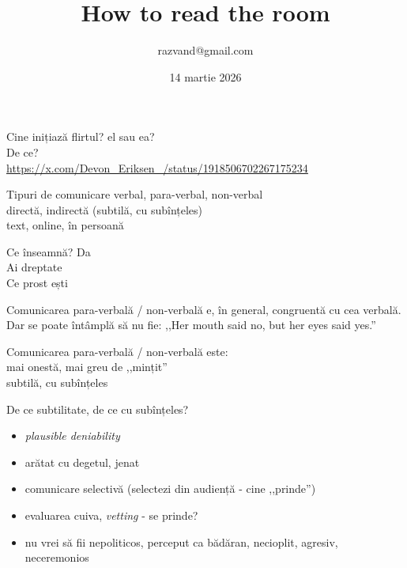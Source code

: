 \documentclass{simple}
\title[How to read the room]{How to read the room}
\institute{Excursie, Bușteni}
\author[Razvan Deaconescu]{razvand@gmail.com}
\date{14 martie 2026}
\begin{document}
\frame{\titlepage}

\begin{frame}{Cine inițiază flirtul?}
  \centering
  \pause
  \Large
  el sau ea? \\
  \pause
  \vspace{1cm}
  De ce? \\
  \pause
  \vspace{1cm}
  \small
  \url{https://x.com/Devon_Eriksen_/status/1918506702267175234}
\end{frame}

\begin{frame}{Tipuri de comunicare}
  \centering
  \pause
  \Large
  verbal, para-verbal, non-verbal \\
  \pause
  \vspace{1cm}
  directă, indirectă (subtilă, cu subînțeles) \\
  \pause
  \vspace{1cm}
  text, online, în persoană
\end{frame}

\begin{frame}{Ce înseamnă?}
  \centering
  \pause
  \Large
  Da \\
  \pause
  \vspace{1cm}
  Ai dreptate \\
  \pause
  \vspace{1cm}
  Ce prost ești
\end{frame}

\begin{frame}{}
  \centering
  \pause
  \Large
  Comunicarea para-verbală / non-verbală e, în general, congruentă cu cea verbală. \\
  \pause
  \vspace{1cm}
  Dar se poate întâmplă să nu fie: ,,Her mouth said no, but her eyes said yes.''
\end{frame}

\begin{frame}{}
  \centering
  \pause
  \Large
  Comunicarea para-verbală / non-verbală este: \\
  \pause
  \vspace{1cm}
  mai onestă, mai greu de ,,mințit'' \\
  \pause
  \vspace{1cm}
  subtilă, cu subînțeles
\end{frame}

\begin{frame}{De ce subtilitate, de ce cu subînțeles?}
  \begin{itemize}
    \pause \item \textit{plausible deniability}
    \pause \item arătat cu degetul, jenat
    \pause \item comunicare selectivă (selectezi din audiență - cine ,,prinde'')
    \pause \item evaluarea cuiva, \textit{vetting} - se prinde?
    \pause \item nu vrei să fii nepoliticos, perceput ca bădăran, necioplit, agresiv, neceremonios
  \end{itemize}
\end{frame}
\end{document}
